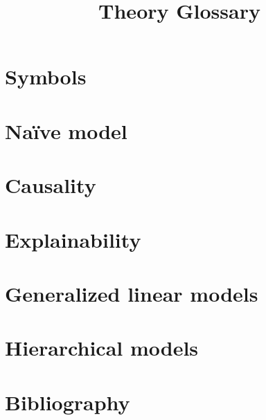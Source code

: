 \documentclass{amsart}
\begin{document}
	\title{Theory Glossary}
	\maketitle

	\tableofcontents

	\section{Symbols}

	\section{Naïve model}

	\section{Causality}

	\section{Explainability}

	\section{Generalized linear models}

	\section{Hierarchical models}



	\section{Bibliography}
	{}
	
\end{document}
